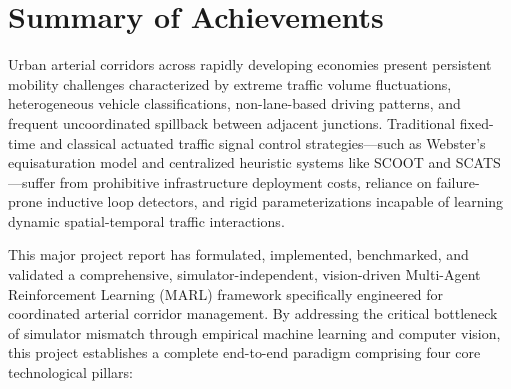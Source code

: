 \documentclass[12pt,a4paper,oneside]{report}
\begin{document}
\section{Summary of Achievements}
\label{sec:summary_achievements}
Urban arterial corridors across rapidly developing economies present persistent mobility challenges characterized by extreme traffic volume fluctuations, heterogeneous vehicle classifications, non-lane-based driving patterns, and frequent uncoordinated spillback between adjacent junctions. Traditional fixed-time and classical actuated traffic signal control strategies—such as Webster's equisaturation model and centralized heuristic systems like SCOOT and SCATS—suffer from prohibitive infrastructure deployment costs, reliance on failure-prone inductive loop detectors, and rigid parameterizations incapable of learning dynamic spatial-temporal traffic interactions.

This major project report has formulated, implemented, benchmarked, and validated a comprehensive, simulator-independent, vision-driven Multi-Agent Reinforcement Learning (MARL) framework specifically engineered for coordinated arterial corridor management. By addressing the critical bottleneck of simulator mismatch through empirical machine learning and computer vision, this project establishes a complete end-to-end paradigm comprising four core technological pillars:
\end{document}

